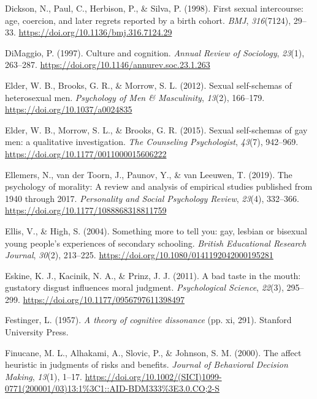 \documentclass[
  english,
  donotrepeattitle,doc, 12pt, a4paper,floatsintext]{apa7}
\newlength{\cslhangindent}
\newlength{\cslentryspacingunit} %
\newenvironment{CSLReferences}[2] %
 {%
  \setlength{\parindent}{0pt}
  \ifodd #1
  \let\oldpar\par
  \def\par{\hangindent=\cslhangindent\oldpar}
  \fi
  \setlength{\parskip}{#2\cslentryspacingunit}
 }%
 {}
\begin{document}
\begin{CSLReferences}{1}{0}
\leavevmode{}%
Dickson, N., Paul, C., Herbison, P., \& Silva, P. (1998). First sexual intercourse: age, coercion, and later regrets reported by a birth cohort. \emph{BMJ}, \emph{316}(7124), 29--33. \url{https://doi.org/10.1136/bmj.316.7124.29}

\leavevmode{}%
DiMaggio, P. (1997). Culture and cognition. \emph{Annual Review of Sociology}, \emph{23}(1), 263--287. \url{https://doi.org/10.1146/annurev.soc.23.1.263}

\leavevmode{}%
Elder, W. B., Brooks, G. R., \& Morrow, S. L. (2012). Sexual self-schemas of heterosexual men. \emph{Psychology of Men \& Masculinity}, \emph{13}(2), 166--179. \url{https://doi.org/10.1037/a0024835}

\leavevmode{}%
Elder, W. B., Morrow, S. L., \& Brooks, G. R. (2015). Sexual self-schemas of gay men: a qualitative investigation. \emph{The Counseling Psychologist}, \emph{43}(7), 942--969. \url{https://doi.org/10.1177/0011000015606222}

\leavevmode{}%
Ellemers, N., van der Toorn, J., Paunov, Y., \& van Leeuwen, T. (2019). The psychology of morality: A review and analysis of empirical studies published from 1940 through 2017. \emph{Personality and Social Psychology Review}, \emph{23}(4), 332--366. \url{https://doi.org/10.1177/1088868318811759}

\leavevmode{}%
Ellis, V., \& High, S. (2004). Something more to tell you: gay, lesbian or bisexual young people's experiences of secondary schooling. \emph{British Educational Research Journal}, \emph{30}(2), 213--225. \url{https://doi.org/10.1080/0141192042000195281}

\leavevmode{}%
Eskine, K. J., Kacinik, N. A., \& Prinz, J. J. (2011). A bad taste in the mouth: gustatory disgust influences moral judgment. \emph{Psychological Science}, \emph{22}(3), 295--299. \url{https://doi.org/10.1177/0956797611398497}

\leavevmode{}%
Festinger, L. (1957). \emph{A theory of cognitive dissonance} (pp. xi, 291). Stanford University Press.

\leavevmode{}%
Finucane, M. L., Alhakami, A., Slovic, P., \& Johnson, S. M. (2000). The affect heuristic in judgments of risks and benefits. \emph{Journal of Behavioral Decision Making}, \emph{13}(1), 1--17. \url{https://doi.org/10.1002/(SICI)1099-0771(200001/03)13:1\%3C1::AID-BDM333\%3E3.0.CO;2-S}


\end{CSLReferences}
\end{document}
